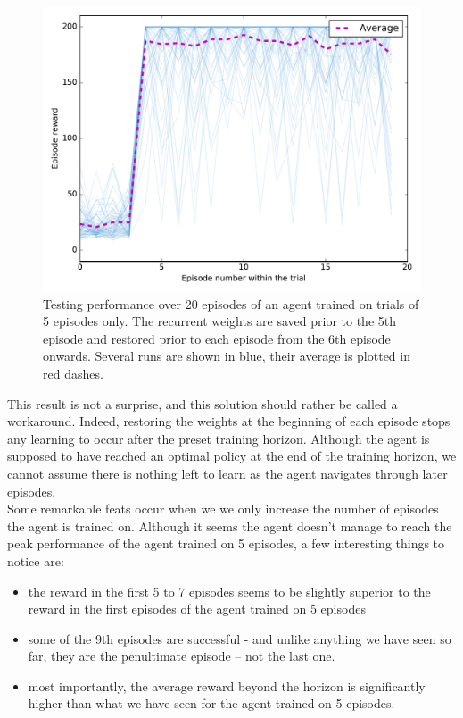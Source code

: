 \begin{figure}
	\centering
	\includegraphics[width=0.8\linewidth]{fig/horizon_5_3perms_restoring.pdf}
	\caption{Testing performance over 20 episodes of an agent trained on 
	trials of 5 episodes only. The recurrent weights are saved prior to 
	the 5th episode and restored prior to each episode from the 6th episode
	onwards. Several runs are shown in blue, their average is plotted in
	red dashes.}
	\label{fig:horizon_5_3perms_restoring}
\end{figure}

This result is not a surprise, and this solution should rather be called a 
workaround. Indeed, restoring the weights at the beginning of each episode
stops any learning to occur after the preset training horizon. Although the
agent is supposed to have reached an optimal policy at the end of the training
horizon, we cannot assume there is nothing left to learn as the agent navigates
through later episodes.\\

Some remarkable feats occur when we we only increase the number of episodes the
agent is trained on. Although it seems the agent doesn't manage to reach
the peak performance of the agent trained on 5 episodes, a few interesting
things to notice are:

\begin{itemize}
	\item the reward in the first 5 to 7 episodes seems to be slightly
		superior to the reward in the first episodes of the agent trained
		on 5 episodes
	\item some of the 9th episodes are successful - and unlike anything
		we have seen so far, they are the penultimate episode -- not
		the last one.
	\item most importantly, the average reward beyond the horizon is
		significantly higher than what we have seen for the agent
		trained on 5 episodes.
\end{itemize}

